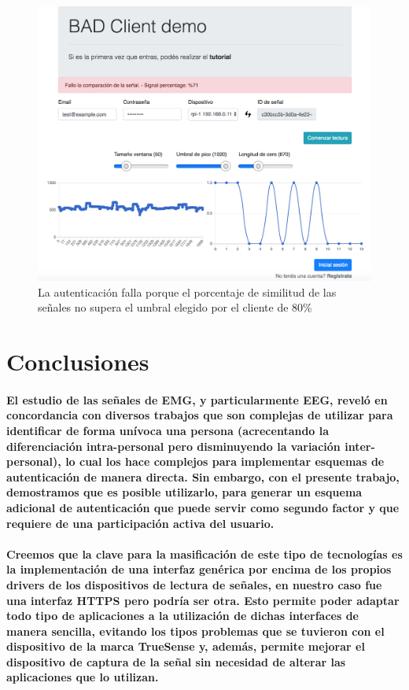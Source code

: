 \documentclass{article}
\begin{document}
\begin{figure}[ht]
    \centering
    \includegraphics[width=\textwidth]{error_1_res.png}%
    \caption{La autenticación falla porque el porcentaje de similitud de las señales no supera el umbral elegido por el cliente de 80\%}
    \label{fig:error-1}
\end{figure}

\section{Conclusiones}
\paragraph{
El estudio de las señales de EMG, y particularmente EEG, reveló en concordancia con diversos trabajos que son complejas de utilizar para identificar de forma unívoca una persona (acrecentando la diferenciación intra-personal pero disminuyendo la variación inter-personal), lo cual los hace complejos para implementar esquemas de autenticación de manera directa. Sin embargo, con el presente trabajo, demostramos que es posible utilizarlo, para generar un esquema adicional de autenticación que puede servir como segundo factor y que requiere de una participación activa del usuario.
}
\paragraph{
Creemos que la clave para la masificación de este tipo de tecnologías es la implementación de una interfaz genérica por encima de los propios drivers de los dispositivos de lectura de señales, en nuestro caso fue una interfaz HTTPS pero podría ser otra. Esto permite poder adaptar todo tipo de aplicaciones a la utilización de dichas interfaces de manera sencilla, evitando los tipos problemas que se tuvieron con el dispositivo de la marca TrueSense y, además, permite mejorar el dispositivo de captura de la señal sin necesidad de alterar las aplicaciones que lo utilizan.
}
\end{document}
